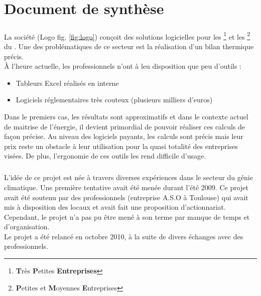 \chapter*{Document de synthèse}
	\paragraph{}
	La société \K{} (Logo fig. \ref{fig:logo}) conçoit des solutions logicielles pour les 
	\footnote{\textbf{T}rès \textbf{P}etites \textbf{Entreprises}} et 
	les \footnote{\textbf{P}etites et \textbf{M}oyennes \textbf{E}ntreprises} du . 
	Une des problématiques de ce secteur est la réalisation d’un bilan thermique précis.\\
	À l'heure actuelle, les professionnels n'ont à leu disposition que peu d'outils :
	\begin{itemize}
		\item Tableurs Excel réalisés en interne
		\item Logiciels réglementaires très couteux (plusieurs milliers d'euros)
	\end{itemize}

	Dans le premiers cas, les résultats sont approximatifs et dans le contexte actuel de maitrise 
	de l'énergie, il devient primordial de pouvoir réaliser ces calculs de façon précise.\newline
	Au niveau des logiciels payants, les calculs sont précis mais leur prix reste un obstacle à 
	leur utilisation pour la quasi totalité des entreprises visées.  De plus, l'ergonomie de ces 
	outils les rend difficile d’usage.

	\paragraph{}
	L'idée de ce projet est née à travers diverses expériences dans le secteur du génie climatique.
	Une première tentative avait été menée durant l'été 2009. Ce projet avait été soutenu par des 
	professionnels (entreprise A.S.O à Toulouse) qui avait mis à disposition des locaux et avait 
	fait une proposition d’actionnariat. Cependant, le projet n’a pas pu être mené à son terme par 
	manque de temps et d’organisation.\\
	Le projet a été relancé en octobre 2010, à la suite de divers échanges avec des professionnels.

